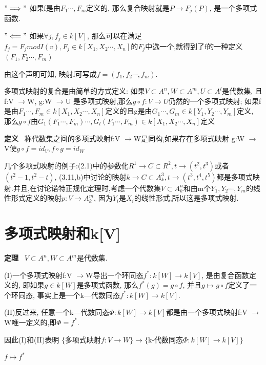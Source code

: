 \documentclass[UTF8]{book}
\begin{document}
		$"\Longrightarrow"$
		如果f是由$F_{1}\cdots,F_{m}$定义的, 那么复合映射就是$P\rightarrow F_{j}(P)$, 是一个多项式函数.

		$"\Longleftarrow"$
		如果$\forall  j, f_{j}\in k[V] $, 那么可以在满足$f_{j}=F_{j} mod I(v), F_{j}\in k[X_{1},X_{2}\cdots,X_{n}]$的$F_{j}$中选一个,就得到了f的一种定义$(F_{1},F_{2}\cdots,F_{m})$

		由这个声明可知, 映射f可写成$f=(f_{1},f_{2}\cdots,f_{m})$.

		多项式映射的复合是由简单的方式定义: 如果$V\subset A^{n}, W\subset A^{m}, U\subset A^{l}$是代数集, 且f:V $\rightarrow $W, g:W $\rightarrow $U 是多项式映射,那么$g\circ f :V \rightarrow U$仍然的一个多项式映射; 如果f是由$F_{1}\cdots,F_{m}\in k[X_{1},X_{2}\cdots,X_{n}]$定义的且g是由$G_{1}\cdots,G_{m}\in k[Y_{1},Y_{2}\cdots,Y_{m}]$定义, 那么$g\circ f$由$G_{1}(F_{1}\cdots,F_{m})\cdots,G_{l}(F_{1}\cdots,F_{m})\in k[X_{1},X_{2}\cdots,X_{n}]$定义

		\textbf{定义} \ 称代数集之间的多项式映射f:V $\rightarrow $W是同构,如果存在多项式映射 g:W $\rightarrow $V使$g\circ f=id_{V}, f\circ g=id_{W}$

		几个多项式映射的例子:(2.1)中的参数化$R^{1}\rightarrow C\subset R^{2}, t\rightarrow (t^{2},t^{3})$或者$(t^{2}-1,t^{2}-t)$, (3.11,b)中讨论的映射$k\rightarrow C\subset A^{3}_{k}, t\rightarrow (t^{3},t^{4},t^{5})$都是多项式映射.并且,在讨论诺特正规化定理时,考虑一个代数集$V\subset A^{n}_{k}$和由m个$Y_{1},Y_{2}\cdots,Y_{m}$的线性形式定义的映射$p:V\rightarrow A^{m}_{k}$, 因为$Y_{i}$是$X_{i}$的线性形式,所以这是多项式映射.

	\section{多项式映射和k[V]}
		\textbf{定理} \ $V\subset A^{n},W\subset A^{m}$是代数集.

		(I)一个多项式映射f:V $\rightarrow $W导出一个环同态$f^{*}:k[W]\rightarrow k[V]$, 是由复合函数定义的, 即如果$g\in k[W]$是多项式函数, 那么$f^{*}(g)=g\circ f$, 并且$g\mapsto g\circ f$定义了一个环同态, 事实上是一个k—代数同态$f^{*}:k[W]\rightarrow k[V]$.

		(II)反过来, 任意一个k—代数同态$\Phi:k[W]\rightarrow k[V]$都是由一个多项式映射f:V $\rightarrow $W唯一定义的,即$\Phi=f^{*}$.

		因此(I)和(II)表明
		\center  $\{$多项式映射$f:V \rightarrow W \}\longrightarrow $$\{$k-代数同态$\Phi:k[W]\rightarrow k[V]\}$



			  $ f \longmapsto f^{*}$
\end{document}
